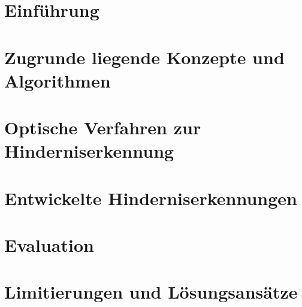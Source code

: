 \documentclass[pdftex,12pt,a4paper]{report}
\begin{document}
\tableofcontents


\chapter{Einführung}
\label{chp:introduction}



\chapter{Zugrunde liegende Konzepte und Algorithmen}
\label{chp:concepts}



\chapter{Optische Verfahren zur Hinderniserkennung}
\label{chp:stateoftheart}



\chapter{Entwickelte Hinderniserkennungen}
\label{chp:developed_algorithms}



\chapter{Evaluation}
\label{chp:evaluation}



\chapter{Limitierungen und Lösungsansätze}
\label{chp:conflicts}



%
\end{document}
